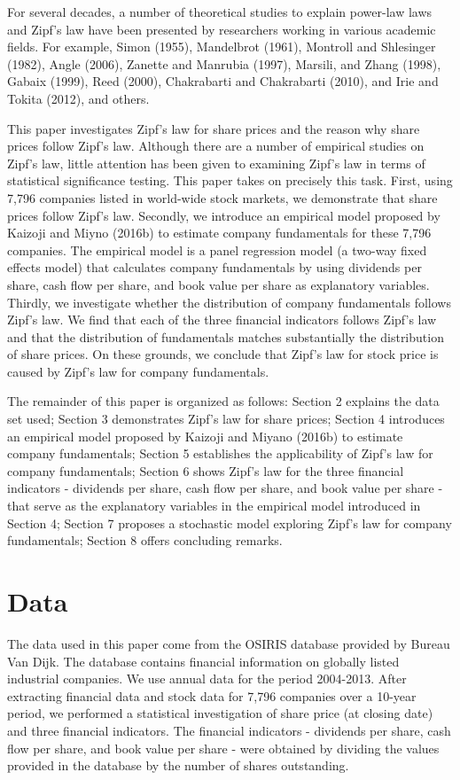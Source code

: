 \documentclass[10pt,a4paper]{article}
\begin{document}
For several decades, a number of theoretical studies to explain power-law laws and Zipf's law have been presented by researchers working in various academic fields. For example, Simon (1955), Mandelbrot (1961), Montroll and Shlesinger (1982), Angle (2006), Zanette and Manrubia (1997), Marsili, and Zhang (1998), Gabaix (1999), Reed (2000), Chakrabarti and Chakrabarti (2010), and Irie and Tokita (2012), and others.

This paper investigates Zipf's law for share prices and the reason why share prices follow Zipf's law. Although there are a number of empirical studies on Zipf's law, little attention has been given to examining Zipf's law in terms of statistical significance testing. This paper takes on precisely this task. First, using 7,796 companies listed in world-wide stock markets, we demonstrate that share prices follow Zipf's law. Secondly, we introduce an empirical model proposed by Kaizoji and Miyno (2016b) to estimate company fundamentals for these 7,796 companies. The empirical model is a panel regression model (a two-way fixed effects model) that calculates company fundamentals by using dividends per share, cash flow per share, and book value per share as explanatory variables. Thirdly, we investigate whether the distribution of company fundamentals follows Zipf's law. We find that each of the three financial indicators follows Zipf's law and that the distribution of fundamentals matches substantially the distribution of share prices. On these grounds, we conclude that Zipf's law for stock price is caused by Zipf's law for company fundamentals.

The remainder of this paper is organized as follows: Section 2 explains the data set used; Section 3 demonstrates Zipf's law for share prices; Section 4 introduces an empirical model proposed by Kaizoji and Miyano (2016b) to estimate company fundamentals; Section 5 establishes the applicability of Zipf's law for company fundamentals; Section 6 shows Zipf's law for the three financial indicators - dividends per share, cash flow per share, and book value per share - that serve as the explanatory variables in the empirical model introduced in Section 4; Section 7 proposes a stochastic model exploring Zipf's law for company fundamentals; Section 8 offers concluding remarks. 



\section{Data}
The data used in this paper come from the OSIRIS database provided by Bureau Van Dijk. The database contains financial information on globally listed industrial companies. We use annual data for the period 2004-2013. After extracting financial data and stock data for 7,796 companies over a 10-year period, we performed a statistical investigation of share price (at closing date) and three financial indicators. The financial indicators - dividends per share, cash flow per share, and book value per share - were obtained by dividing the values provided in the database by the number of shares outstanding. 
 
\end{document}
